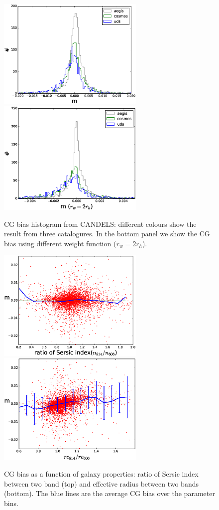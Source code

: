 \documentclass[useAMS,usenatbib]{mn2e}
\begin{document}
%
\begin{figure}
  \includegraphics[width=7.0cm]{zhiscgb.eps}
  \includegraphics[width=7.0cm]{zhiscgbno.eps}
\caption{CG bias histogram from CANDELS: different colours show the
  result from three catalogures. In the bottom panel we show the CG
  bias using different weight function ($r_w = 2r_h$).  }
\label{fig:cgbhis}
\end{figure}
%
%
\begin{figure}
\includegraphics[width=7.0cm]{zcgb-ne17.eps}
\includegraphics[width=7.0cm]{zcgb-re17.eps}
\caption{CG bias as a function of galaxy properties: ratio of Sersic
  index between two band (top) and effective radius between two bands
  (bottom). The blue lines are the average CG bias over the parameter
  bins.}
\label{fig:cg2fitpar}
\end{figure}
\end{document}
